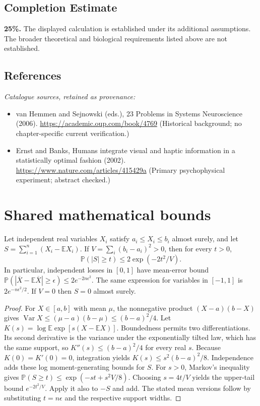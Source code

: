 \documentclass[11pt]{article}
\begin{document}
\subsection{Completion Estimate}
\textbf{25\%.} The displayed calculation is established under its additional assumptions. The broader theoretical and biological requirements listed above are not established.
\subsection{References}
\noindent\emph{Catalogue sources, retained as provenance:}
\begin{itemize}
\item van Hemmen and Sejnowski (eds.), 23 Problems in Systems Neuroscience (2006). \url{https://academic.oup.com/book/4769} (Historical background; no chapter-specific current verification.)
\item Ernst and Banks, Humans integrate visual and haptic information in a statistically optimal fashion (2002). \url{https://www.nature.com/articles/415429a} (Primary psychophysical experiment; abstract checked.)
\end{itemize}




\section{Shared mathematical bounds}\label{app:bounds}
\begin{lemma}\label{lem:bounded}
Let independent real variables $X_i$ satisfy $a_i\leq X_i\leq b_i$ almost surely,
and let $S=\sum_{i=1}^n(X_i-\mathbb{E} X_i)$. If
$V=\sum_i(b_i-a_i)^2>0$, then for every $t>0$,
\[
 \mathbb{P}(|S|\geq t)\leq 2\exp(-2t^2/V).
\]
In particular, independent losses in $[0,1]$ have mean-error bound
$\mathbb{P}(|\overline X-\mathbb{E}\overline X|\geq\epsilon)
\leq2e^{-2n\epsilon^2}$. The same expression for variables in $[-1,1]$
is $2e^{-n\epsilon^2/2}$. If $V=0$ then $S=0$ almost surely.
\end{lemma}
\begin{proof}
For $X\in[a,b]$ with mean $\mu$, the nonnegative product
$(X-a)(b-X)$ gives
$\operatorname{Var} X\leq(\mu-a)(b-\mu)\leq(b-a)^2/4$.
Let $K(s)=\log\mathbb{E}\exp[s(X-\mathbb{E} X)]$.
Boundedness permits two differentiations. Its second derivative is the variance
under the exponentially tilted law, which has the same support, so
$K''(s)\leq(b-a)^2/4$ for every real $s$.
Because $K(0)=K'(0)=0$, integration yields
$K(s)\leq s^2(b-a)^2/8$.
Independence adds these log moment-generating bounds for $S$.
For $s>0$, Markov's inequality gives
$\mathbb{P}(S\geq t)\leq\exp(-st+s^2V/8)$.
Choosing $s=4t/V$ yields the upper-tail bound $e^{-2t^2/V}$.
Apply it also to $-S$ and add. The stated mean versions follow by substituting
$t=n\epsilon$ and the respective support widths.
\end{proof}
\end{document}
